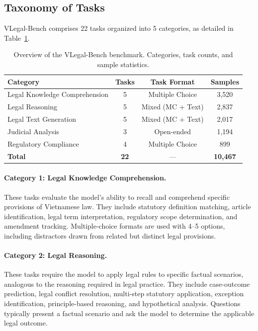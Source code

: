 \documentclass[11pt,a4paper]{article}
\newcommand{\system}{VLegal-Bench}
\begin{document}
\subsection{Taxonomy of Tasks}

\system{} comprises 22 tasks organized into 5 categories, as detailed in Table~\ref{tab:benchmark_overview}.

\begin{table}[htbp]
\centering
\caption{Overview of the \system{} benchmark. Categories, task counts, and sample statistics.}
\label{tab:benchmark_overview}
\begin{tabular}{@{}lccc@{}}
\toprule
\textbf{Category} & \textbf{Tasks} & \textbf{Task Format} & \textbf{Samples} \\
\midrule
Legal Knowledge Comprehension & 5 & Multiple Choice & 3{,}520 \\
Legal Reasoning & 5 & Mixed (MC + Text) & 2{,}837 \\
Legal Text Generation & 5 & Mixed (MC + Text) & 2{,}017 \\
Judicial Analysis & 3 & Open-ended & 1{,}194 \\
Regulatory Compliance & 4 & Multiple Choice & 899 \\
\midrule
\textbf{Total} & \textbf{22} & --- & \textbf{10{,}467} \\
\bottomrule
\end{tabular}
\end{table}

\paragraph{Category 1: Legal Knowledge Comprehension.}
These tasks evaluate the model's ability to recall and comprehend specific provisions of Vietnamese law.
They include statutory definition matching, article identification, legal term interpretation, regulatory scope determination, and amendment tracking.
Multiple-choice formats are used with 4--5 options, including distractors drawn from related but distinct legal provisions.

\paragraph{Category 2: Legal Reasoning.}
These tasks require the model to apply legal rules to specific factual scenarios, analogous to the reasoning required in legal practice.
They include case-outcome prediction, legal conflict resolution, multi-step statutory application, exception identification, principle-based reasoning, and hypothetical analysis.
Questions typically present a factual scenario and ask the model to determine the applicable legal outcome.
\end{document}
